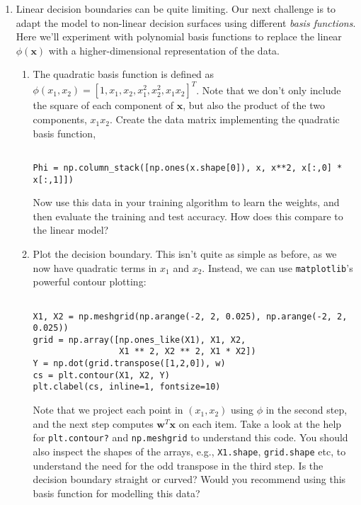 \documentclass{article}
\begin{document}
\begin{enumerate}
\begin{enumerate}
\end{enumerate}

\item Linear decision boundaries can be quite limiting. Our next challenge is to adapt the model to non-linear decision surfaces using different \emph{basis functions}. Here we'll experiment with polynomial basis functions to replace the linear $\phi(\mathbf{x})$ with a higher-dimensional representation of the data.

\begin{enumerate}  
\item The quadratic basis function is defined as $\phi(x_1, x_2) = [1, x_1, x_2, x_1^2, x_2^2, x_1 x_2]^T$. Note that we don't only include the square of each component of $\mathbf{x}$, but also the product of the two components, $x_1 x_2$.  Create the data matrix implementing the quadratic basis function,
\begin{verbatim}

Phi = np.column_stack([np.ones(x.shape[0]), x, x**2, x[:,0] * x[:,1]])
\end{verbatim}
Now use this data in your training algorithm to learn the weights, and then evaluate the training and test accuracy. How does this compare to the linear model?

\item Plot the decision boundary. This isn't quite as simple as before, as we now have quadratic terms in $x_1$ and $x_2$. Instead, we can use \texttt{matplotlib}'s powerful contour plotting:
\begin{verbatim}

X1, X2 = np.meshgrid(np.arange(-2, 2, 0.025), np.arange(-2, 2, 0.025))
grid = np.array([np.ones_like(X1), X1, X2, 
                 X1 ** 2, X2 ** 2, X1 * X2])
Y = np.dot(grid.transpose([1,2,0]), w)
cs = plt.contour(X1, X2, Y)
plt.clabel(cs, inline=1, fontsize=10)
\end{verbatim}
Note that we project each point in $(x_1, x_2)$ using $\phi$ in the second step, and the next step computes $\mathbf{w}^T \mathbf{x}$ on each item. Take a look at the help for \lstinline+plt.contour?+ and \lstinline+np.meshgrid+ to understand this code. You should also inspect the shapes of the arrays, e.g., \lstinline+X1.shape+, \lstinline+grid.shape+ etc, to understand the need for the odd transpose in the third step. Is the decision boundary straight or curved? Would you recommend using this basis function for modelling this data?


\end{enumerate}
\end{enumerate}
\end{document}
